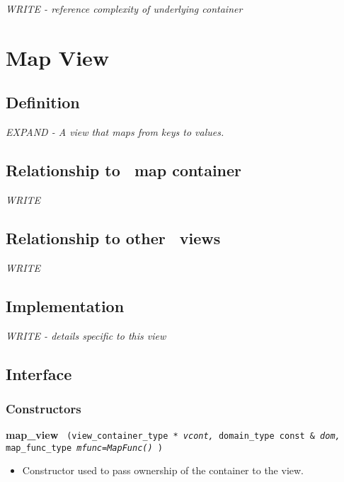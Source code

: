 \emph{WRITE - reference complexity of underlying container}


\section{Map View} \label{sec-map-vw}

\subsection{Definition}

\textit{EXPAND - A view that maps from keys to values.}

\subsection{Relationship to \stapl\ map container}

\textit{WRITE}

\subsection{Relationship to other \stapl\ views}

\textit{WRITE}

\subsection{Implementation}

\textit{WRITE - details specific to this view}

\subsection{Interface} \label{sec-map-vw-inter}

\subsubsection{Constructors}

\noindent
\textbf{map\_view}%
\texttt{%
(view\_container\_type *
\textit{vcont,}%
domain\_type const \&
\textit{dom,}%
    map\_func\_type
\textit{mfunc=MapFunc()}%
)
}

\begin{itemize}
\item
Constructor used to pass ownership of the container to the view.
\end{itemize}

